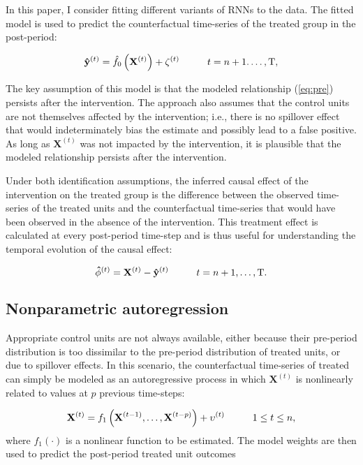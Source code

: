 \documentclass[hidelinks,12pt]{article}
\begin{document}
In this paper, I consider fitting different variants of RNNs to the data. The fitted model is used to predict the counterfactual time-series of the treated group in the post-period: 

\begin{equation}\label{eq:post}
  \mathbf{\hat{y}}^{(t)} =  \hat{f_0} \left(\mathbf{X}^{(t)}\right) + \zeta^{(t)}  \hspace{10mm} t = n+1. \ldots, \text{T}, 
\end{equation}

The key assumption of this model is that the modeled relationship (\ref{eq:pre}) persists after the intervention. The approach also assumes that the control units are not themselves affected by the intervention; i.e., there is no spillover effect that would indeterminately bias the estimate and possibly lead to a false positive. As long as $\mathbf{X}^{(t)}$ was not impacted by the intervention, it is plausible that the modeled relationship persists after the intervention. 

Under both identification assumptions, the inferred causal effect of the intervention on the treated group is the difference between the observed time-series of the treated units and the counterfactual time-series that would have been observed in the absence of the intervention. This treatment effect is calculated at every post-period time-step and is thus useful for understanding the temporal evolution of the causal effect:

\begin{equation}\label{eq:pointwise}
  \mathbf{\hat{\phi}}^{(t)} = \mathbf{X}^{(t)} - \mathbf{\hat{y}}^{(t)} \hspace{10mm} t = n+1, \ldots, \text{T}. 
\end{equation}

\subsection{Nonparametric autoregression}

Appropriate control units are not always available, either because their pre-period distribution is too dissimilar to the pre-period distribution of treated units, or due to spillover effects. In this scenario, the counterfactual time-series of treated can simply be modeled as an autoregressive process in which $\mathbf{X}^{(t)}$ is nonlinearly related to values at $p$ previous time-steps:

\begin{equation}\label{eq:ar-pre}
\mathbf{X}^{(t)} =  f_1 \left(\mathbf{X}^{(t-1)}, \ldots, \mathbf{X}^{(t-p)}\right) + \upsilon^{(t)} \hspace{10mm} 1 \leq t \leq n, 
\end{equation} %
\noindent
where $f_1 (\cdot)$ is a nonlinear function to be estimated. The model weights are then used to predict the post-period treated unit outcomes
\end{document}
